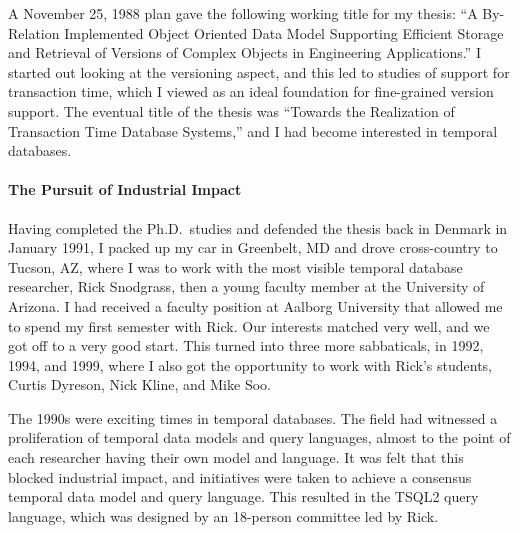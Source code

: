 \documentclass[11pt]{article}
\begin{document}
A November 25, 1988 plan gave the following working title for my thesis: ``A By-Relation Implemented Object Oriented Data Model Supporting Efficient Storage and Retrieval of Versions of Complex Objects in Engineering Applications.'' I started out looking at the versioning aspect, and this led to studies of support for transaction time, which I viewed as an ideal foundation for fine-grained version support. The eventual title of the thesis was ``Towards the Realization of Transaction Time Database Systems,'' and I had become interested in temporal databases.

\paragraph{The Pursuit of Industrial Impact} Having completed the Ph.D.\ studies and defended the thesis back in Denmark in January 1991, I packed up my car in Greenbelt, MD and drove cross-country to Tucson, AZ, where I was to work with the most visible temporal database researcher, Rick Snodgrass, then a young faculty member at the University of Arizona. I had received a faculty position at Aalborg University that allowed me to spend my first semester with Rick. Our interests matched very well, and we got off to a very good start. This turned into three more sabbaticals, in 1992, 1994, and 1999, where I also got the opportunity to work with Rick's students, Curtis Dyreson, Nick Kline, and Mike Soo.

The 1990s were exciting times in temporal databases. The field had witnessed a proliferation of temporal data models and query languages, almost to the point of each researcher having their own model and language. It was felt that this blocked industrial impact, and initiatives were taken to achieve a consensus temporal data model and query language. This resulted in the TSQL2 query language, which was designed by an 18-person committee led by Rick. 
\end{document}
